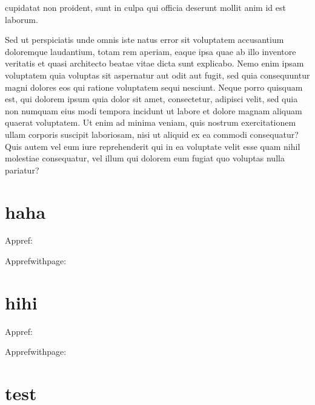 \documentclass{article}
\begin{document}
\beginnumbering
\pstart
{}
 cupidatat non proident, sunt in culpa qui officia deserunt mollit anim id est laborum.
\pend

\newpage

Sed ut perspiciatis unde omnis iste natus error sit voluptatem accusantium doloremque laudantium, totam rem aperiam, eaque ipsa quae ab illo inventore veritatis et quasi architecto beatae vitae dicta sunt explicabo. Nemo enim ipsam voluptatem quia voluptas sit aspernatur aut odit aut fugit, sed quia consequuntur magni dolores eos qui ratione voluptatem sequi nesciunt. Neque porro quisquam est, qui dolorem ipsum quia dolor sit amet, consectetur, adipisci velit, sed quia non numquam eius modi tempora incidunt ut labore et dolore magnam aliquam quaerat voluptatem. Ut enim ad minima veniam, quis nostrum exercitationem ullam corporis suscipit laboriosam, nisi ut aliquid ex ea commodi consequatur? Quis autem vel eum iure reprehenderit qui in ea voluptate velit esse quam nihil molestiae consequatur, vel illum qui dolorem eum fugiat quo voluptas nulla pariatur?
\endnumbering

\section{haha}
Appref: 

Apprefwithpage: 

\section{hihi}
Appref: 

Apprefwithpage: 

\section{test}
\end{document}
